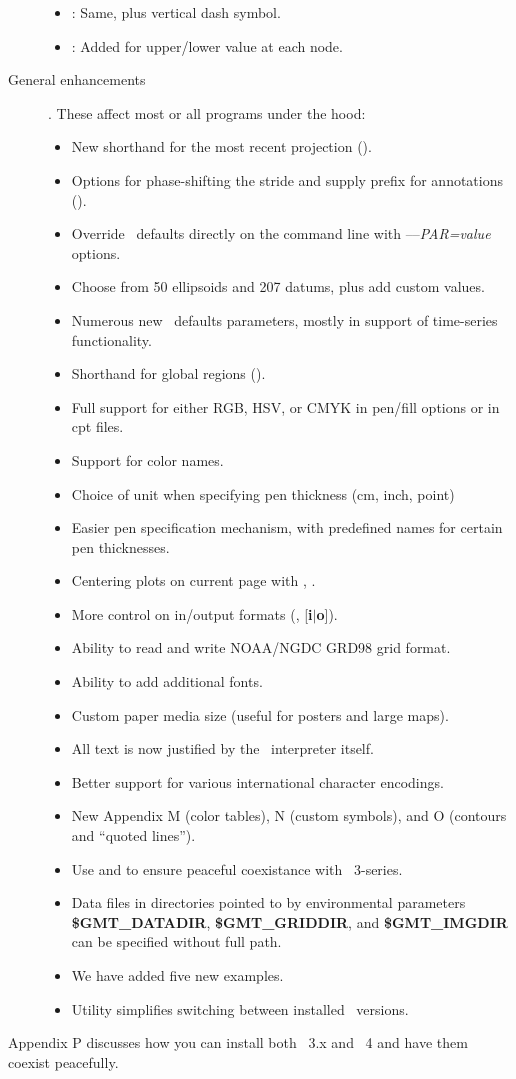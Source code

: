 \begin{description}
\begin{itemize}
\item {}: 	Same, plus vertical dash symbol.
\item {}: 	Added  for upper/lower value at each node.
\end{itemize}
\item [General enhancements].  These affect most or all programs under the hood:
\begin{itemize}
\item New shorthand for the most recent projection ().
\item Options for phase-shifting the stride and supply prefix for annotations ().
\item Override \GMT\ defaults directly on the command line with {--}{--}\emph{PAR=value} options.
\item Choose from 50 ellipsoids and 207 datums, plus add custom values.
\item Numerous new \GMT\ defaults parameters, mostly in support of time-series functionality.
\item Shorthand for global regions ().
\item Full support for either RGB, HSV, or CMYK in pen/fill options or in cpt files.
\item Support for color names.
\item Choice of unit when specifying pen thickness (cm, inch, point)
\item Easier pen specification mechanism, with predefined names for certain pen thicknesses.
\item Centering plots on current page with , .
\item More control on in/output formats (, \Opt{:}[{\bf i$|$o}]).
\item Ability to read and write NOAA/NGDC GRD98 grid format.
\item Ability to add additional fonts.
\item Custom paper media size (useful for posters and large maps).
\item All text is now justified by the \PS\ interpreter itself.
\item Better support for various international character encodings.
\item New Appendix M (color tables), N (custom symbols), and O (contours and ``quoted lines'').
\item Use  and  to ensure peaceful coexistance with \GMT\ 3-series.
\item Data files in directories pointed to by environmental parameters {\bf \$GMT_DATADIR}, {\bf \$GMT_GRIDDIR},
and {\bf \$GMT_IMGDIR} can be specified without full path.
\item We have added five new examples.
\item Utility  simplifies switching between installed \GMT\ versions.
\end{itemize}
\end{description}
Appendix P discusses how you can install both \GMT\ 3.x and \GMT\ 4 and have them coexist peacefully.
